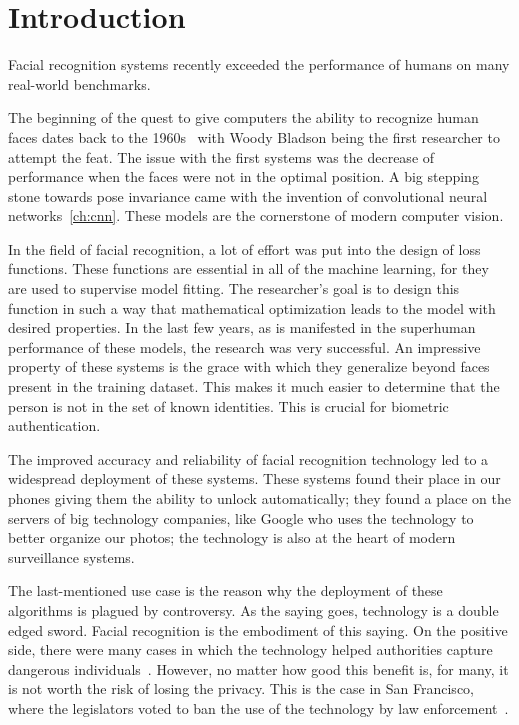 \chapter{Introduction}\label{ch:introduction}
Facial recognition systems recently exceeded the performance of humans on many real-world benchmarks.

The beginning of the quest to give computers the ability to recognize human faces dates back to the 1960s~\cite{History}
with Woody Bladson being the first researcher to attempt the feat.
The issue with the first systems was the decrease of performance when the faces were not in the optimal position.
A big stepping stone towards pose invariance came with the invention of convolutional neural networks~\ref{ch:cnn}.
These models are the cornerstone of modern computer vision.

In the field of facial recognition, a lot of effort was put into the design of loss functions.
These functions are essential in all of the machine learning, for they are used to supervise model fitting.
The researcher's goal is to design this function in such a way that mathematical optimization leads to the model
with desired properties.
In the last few years, as is manifested in the superhuman performance of these models, the research was very successful.
An impressive property of these systems is the grace with which they generalize beyond faces present in the training
dataset.
This makes it much easier to determine that the person is not in the set of known identities.
This is crucial for biometric authentication.

The improved accuracy and reliability of facial recognition technology led to a widespread deployment of these systems.
These systems found their place in our phones giving them the ability to unlock automatically;
they found a place on the servers of big technology companies, like Google who uses the technology to better organize
our photos;
the technology is also at the heart of modern surveillance systems.

The last-mentioned use case is the reason why the deployment of these algorithms is plagued by controversy.
As the saying goes, technology is a double edged sword.
Facial recognition is the embodiment of this saying.
On the positive side, there were many cases in which the technology helped authorities capture dangerous
individuals~\cite{FacRecCon}.
However, no matter how good this benefit is, for many, it is not worth the risk of losing the privacy.
This is the case in San Francisco, where the legislators voted to ban the use of the technology by
law enforcement~\cite{FacRecSan}.


